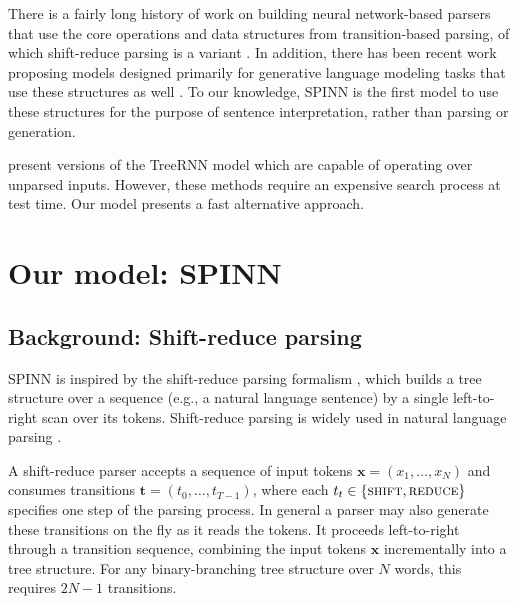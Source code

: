 \documentclass[11pt]{article}
\newcommand{\shift}{\textsc{shift}}
\newcommand{\reduce}{\textsc{reduce}}
\begin{document}
There is a fairly long history of work on building neural network-based parsers that use the core operations and data structures from transition-based parsing, of which shift-reduce parsing is a variant \citep{henderson2004discriminative,emami2005neural,titov2010latent,chen2014,buys2generative,dyer-EtAl:2015:ACL-IJCNLP,kiperwasser2016easy}. In addition, there has been recent work proposing models designed primarily for generative language modeling tasks that use these structures as well \citep{zhang2016top,dyer2016rnn}. To our knowledge, SPINN is the first model to use these structures for the purpose of sentence interpretation, rather than parsing or generation.  %

\citet{socher2011parsing,socher2011semi} present versions of the TreeRNN model which are capable of operating over unparsed inputs. However, these methods require an expensive search process at test time. Our model presents a fast alternative approach.

\section{Our model: SPINN}

\subsection{Background: Shift-reduce parsing}

SPINN is inspired by the shift-reduce parsing formalism \citep{aho1972theory}, which builds a tree structure over a sequence (e.g., a natural language sentence) by a single left-to-right scan over its tokens. Shift-reduce parsing is widely used in natural language parsing \citep[e.g.,][]{shieber:1983:ACL,nivre2003efficient}.

A shift-reduce parser accepts a sequence of input tokens $\mathbf x = (x_1, \dots, x_N)$ and consumes transitions $\mathbf t = (t_0, \dots, t_{T-1})$, where each $t_t \in \{\shift, \reduce\}$ specifies one step of the parsing process. In general a parser may also generate these transitions on the fly as it reads the tokens. It proceeds left-to-right through a transition sequence, combining the input tokens $\mathbf x$ incrementally into a tree structure. For any binary-branching tree structure over $N$ words, this requires $2N - 1$ transitions.
\end{document}
